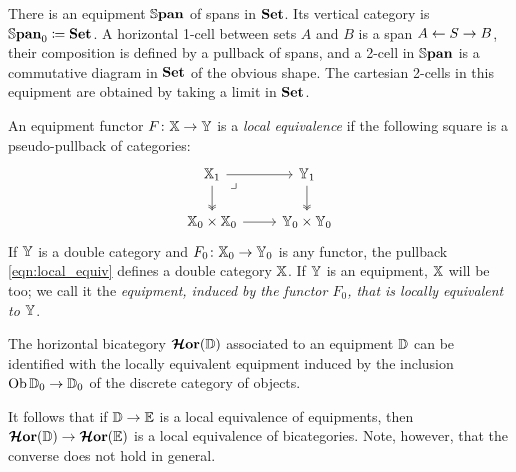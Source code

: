 \documentclass[12pt,oneside,article,draft]{memoir}
\begin{document}
\begin{example}

There is an equipment $\mathbb{S}\mathbf{pan}$ of spans in $\mathbf{Set}$. Its vertical category is $\mathbb{S}\mathbf{pan}_0\coloneqq\mathbf{Set}$. A horizontal 1-cell between sets $A$ and $B$ is a span $A\leftarrow S\to B$, their composition is defined by a pullback of spans, and a 2-cell in $\mathbb{S}\mathbf{pan}$ is a commutative diagram in $\mathbf{Set}$ of the obvious shape. The cartesian 2-cells in this equipment are obtained by taking a limit in $\mathbf{Set}$.

\end{example}

\begin{definition}\label{def:local_equivalence}
   An equipment functor $F\colon\mathbb{X}\to\mathbb{Y}$ is a \emph{local equivalence} if the following square is a pseudo-pullback of categories:
   \begin{equation}\label{eqn:local_equiv}
      \begin{tikzcd}
         \dcat{X}_1 \ar[r] \ar[d,two heads] \ar[dr,phantom,"\lrcorner" very near start]
            & \dcat{Y}_1 \ar[d,two heads] \\
         \dcat{X}_0\times\dcat{X}_0 \ar[r]
            & \dcat{Y}_0\times\dcat{Y}_0
      \end{tikzcd}
   \end{equation}
If $\mathbb{Y}$ is a double category and $F_0\colon\mathbb{X}_0\to\mathbb{Y}_0$ is any functor, the pullback \eqref{eqn:local_equiv} defines a double category $\mathbb{X}$. If $\mathbb{Y}$ is an equipment, $\mathbb{X}$ will be too; we call it the \emph{equipment, induced by the functor $F_0$, that is locally equivalent to $\mathbb{Y}$}.
\end{definition}

\begin{example}\label{ex:horizontal_bicategory}

The horizontal bicategory $\bm{\mathcal{H}}\mathbf{or}(\mathbb{D})$ associated to an equipment $\mathbb{D}$ can be identified with the locally equivalent equipment induced by the inclusion $\operatorname{Ob}\mathbb{D}_0\to\mathbb{D}_0$ of the discrete category of objects. 

It follows that if $\mathbb{D}\to\mathbb{E}$ is a local equivalence of equipments, then $\bm{\mathcal{H}}\mathbf{or}(\mathbb{D})\to\bm{\mathcal{H}}\mathbf{or}(\mathbb{E})$ is a local equivalence of bicategories. Note, however, that the converse does not hold in general.

\end{example}
\end{document}
